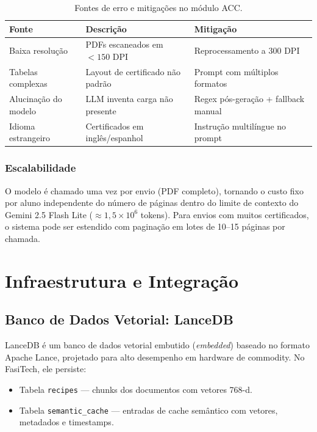 \documentclass[12pt,a4paper]{report}
\begin{document}
\begin{table}[H]
\centering
\caption{Fontes de erro e mitigações no módulo ACC.}
\label{tab:erros}
\begin{tabularx}{\textwidth}{lXX}
\toprule
\textbf{Fonte} & \textbf{Descrição} & \textbf{Mitigação} \\
\midrule
Baixa resolução & PDFs escaneados em $<150$ DPI & Reprocessamento a 300 DPI \\
Tabelas complexas & Layout de certificado não padrão & Prompt com múltiplos formatos \\
Alucinação do modelo & LLM inventa carga não presente & Regex pós-geração + fallback manual \\
Idioma estrangeiro & Certificados em inglês/espanhol & Instrução multilíngue no prompt \\
\bottomrule
\end{tabularx}
\end{table}

\subsection{Escalabilidade}

O modelo é chamado uma vez por envio (PDF completo), tornando o custo
fixo por aluno independente do número de páginas dentro do limite de
contexto do Gemini 2.5 Flash Lite ($\approx 1{,}5\times10^6$ tokens).
Para envios com muitos certificados, o sistema pode ser estendido com
paginação em lotes de 10--15 páginas por chamada.

\chapter{Infraestrutura e Integração}

\section{Banco de Dados Vetorial: LanceDB}

LanceDB \autocite{lancedb2023} é um banco de dados vetorial embutido
(\textit{embedded}) baseado no formato Apache Lance, projetado para
alto desempenho em hardware de commodity.
No FasiTech, ele persiste:

\begin{itemize}
  \item Tabela \texttt{recipes} — chunks dos documentos com vetores 768-d.
  \item Tabela \texttt{semantic\_cache} — entradas de cache semântico com
        vetores, metadados e timestamps.
\end{itemize}
\end{document}
